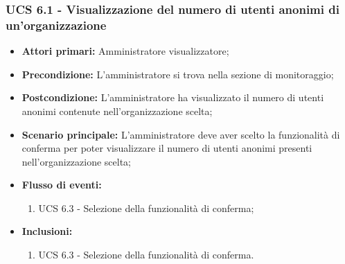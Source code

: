 \subsubsection{UCS 6.1 - Visualizzazione del numero di utenti anonimi di un'organizzazione}%
\begin{itemize}
\item \textbf{Attori primari:} Amministratore visualizzatore;
\item \textbf{Precondizione:} L'amministratore si trova nella sezione di monitoraggio;
\item \textbf{Postcondizione:} L'amministratore ha visualizzato il numero di utenti anonimi contenute nell'organizzazione scelta;
\item \textbf{Scenario principale:} L'amministratore deve aver scelto la funzionalità di conferma per poter visualizzare il numero di utenti anonimi presenti nell'organizzazione scelta;
\item \textbf{Flusso di eventi:} 
\begin{enumerate}
	\item UCS 6.3 - Selezione della funzionalità di conferma;
\end{enumerate}
\item \textbf{Inclusioni:}
\begin{enumerate}
	\item UCS 6.3 - Selezione della funzionalità di conferma.
\end{enumerate}
\end{itemize}

